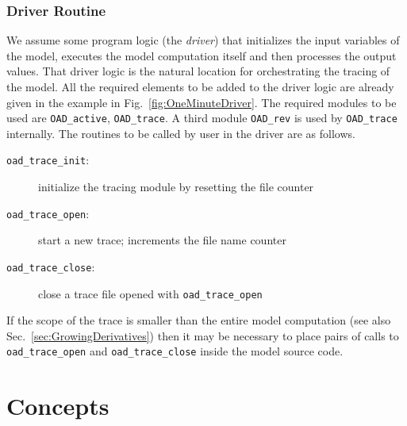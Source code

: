 \documentclass{article}
\newcommand{\refsec}[1]{{Sec.~\ref{#1}}}
\newcommand{\reffig}[1]{{Fig.~\ref{#1}}}
\begin{document}
\subsubsection{Driver Routine}\label{sec:DriverRoutine}

We assume some program logic (the {\em driver}) that initializes the input variables of the model, executes the model 
computation itself and then processes the output values. 
That driver logic  is the natural location for orchestrating the tracing of the model. 
All the required elements to be added to the driver logic are already given in the example 
in \reffig{fig:OneMinuteDriver}. The required modules to be used are \lstinline{OAD_active}, 
\lstinline{OAD_trace}. A third module \lstinline{OAD_rev} is used by \lstinline{OAD_trace}
internally. The routines to be called by user in the driver are as follows.
\begin{description}
\item[{\tt oad\_trace\_init}:] initialize the tracing module by resetting the file counter
\item[{\tt oad\_trace\_open}:] start a new trace; increments the file name counter 
\item[{\tt oad\_trace\_close}:] close a trace file opened with \lstinline{oad_trace_open}
\end{description}   
If the scope of the trace is smaller than the entire model computation (see also \refsec{sec:GrowingDerivatives})
then it may be necessary to place pairs of calls to \lstinline{oad_trace_open} and \lstinline{oad_trace_close} inside the model 
source code. 

\section{Concepts}
\end{document}
